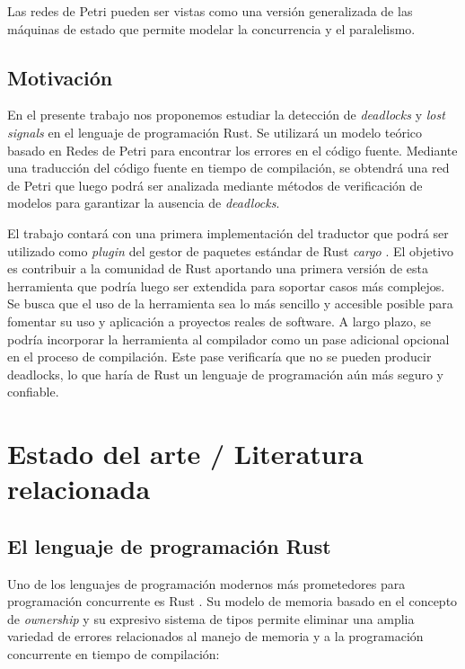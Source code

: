 \documentclass[12pt]{article}
\begin{document}
Las redes de Petri pueden ser vistas como una versión generalizada de las máquinas de estado que permite modelar la concurrencia y el paralelismo.

\subsection{Motivación}

En el presente trabajo nos proponemos estudiar la detección de \textit{deadlocks} y \textit{lost signals} en el lenguaje de programación Rust.
Se utilizará un modelo teórico basado en Redes de Petri para encontrar los errores en el código fuente. Mediante una traducción del código fuente
en tiempo de compilación, se obtendrá una red de Petri que luego podrá ser analizada mediante métodos de verificación de modelos para garantizar la ausencia de \textit{deadlocks}.

El trabajo contará con una primera implementación del traductor que podrá ser utilizado como \textit{plugin}
del gestor de paquetes estándar de Rust \textit{cargo} \cite{cargo-website}.
El objetivo es contribuir a la comunidad de Rust aportando una primera versión de esta herramienta que podría luego ser extendida para soportar casos más complejos.
Se busca que el uso de la herramienta sea lo más sencillo y accesible posible para fomentar su uso y aplicación a proyectos reales de software.
A largo plazo, se podría incorporar la herramienta al compilador como un pase adicional opcional en el proceso de compilación.
Este pase verificaría que no se pueden producir deadlocks, lo que haría de Rust un lenguaje de programación aún más seguro y confiable.

\bigskip

\section{Estado del arte / Literatura relacionada}

\subsection{El lenguaje de programación Rust}

Uno de los lenguajes de programación modernos más prometedores para programación concurrente es Rust \cite{rust-website}.
Su modelo de memoria basado en el concepto de \textit{ownership} y su expresivo sistema de tipos permite eliminar una amplia variedad de
errores relacionados al manejo de memoria y a la programación concurrente en tiempo de compilación:
\end{document}
